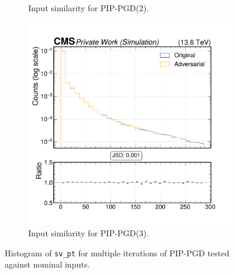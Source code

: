 \begin{figure}[htbp]
\begin{subfigure}[t]{0.32\textwidth}
    \caption*{Input similarity for PIP-PGD(2).}
  \end{subfigure}\hfill
  \begin{subfigure}[t]{0.32\textwidth}
    \includegraphics[width=\linewidth]{media/output/features/compare/combined_it_3/cmp_vtx_arr_sv_pt.pdf}
    \caption*{Input similarity for PIP-PGD(3).}
  \end{subfigure}

  \caption*{Histogram of \texttt{sv\_pt} for multiple iterations of PIP-PGD tested against nominal inputs.}
  \label{fig:combined_input_sv_pt}
\end{figure}

\newpage